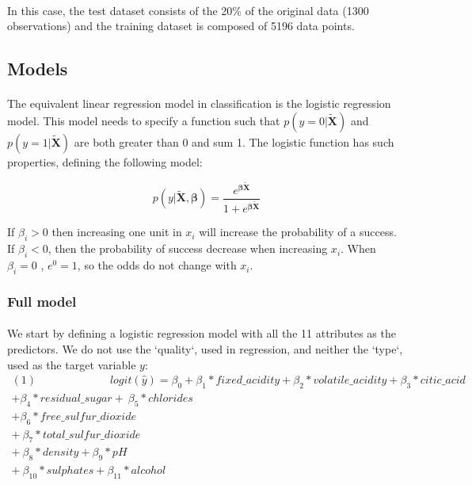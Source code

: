 \documentclass[10pt]{article}
\begin{document}
\paragraph*{}
In this case, the test dataset consists of the 20\% of the original data (1300 observations) and the training dataset is composed of 5196 data points.

\subsection{Models}

\paragraph*{}
The equivalent linear regression model in classification is the logistic regression model. This model needs to specify a function such that $p(y=0|\bm{\tilde{X}})$ and $p(y=1|\bm{\tilde{X}})$ are both greater than 0 and sum 1. The logistic function has such properties, defining the following model:

$$ p(y|\bm{\tilde{X}},\bm{\beta}) = \frac{e^{\bm{\beta} \bm{\tilde{X}}}}{1+e^{\bm{\beta} \bm{\tilde{X}}}} $$

If $\beta_i > 0$ then increasing one unit in $x_i$ will increase the probability of a success. If $\beta_i < 0$,
then the probability of success decrease when increasing $x_i$. When $\beta_i = 0$ , $e^0 = 1$, so the odds do not change with $x_i$.

\subsubsection{Full model}

\paragraph*{}
We start by defining a logistic regression model with all the 11 attributes as the predictors. We do not use the `quality`, used in regression, and neither the `type`, used as the target variable $y$:
\begin{equation*}
\begin{aligned}	
(1) \ \ \ \  \ \ \ \ \ \ \ \ \ \ \ \ \ \ \ \ \ \ \ \ \ \ \ \ \ \ logit(\hat{y}) = \beta_0 + \beta_1*fixed\_acidity + \beta_2*volatile\_acidity 
+ \beta_3*citic\_acid  \\ +\beta_4*residual\_sugar 
+ \ \beta_5*chlorides\\ + \beta_6*free\_sulfur\_dioxide  \\+ \ \beta_7*total\_sulfur\_dioxide   
\\ + \ \beta_8*density + \beta_9*pH  \\+ \ \beta_{10}*sulphates + \beta_{11}*alcohol 	
\end{aligned}
\end{equation*}
\end{document}
